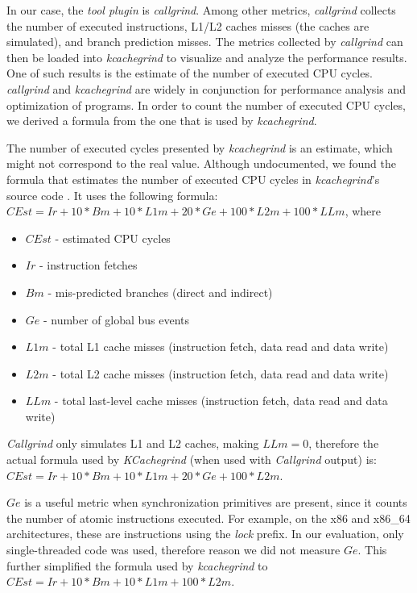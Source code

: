 \documentclass{llncs}
\begin{document}
In our case, the \textit{tool plugin} is \textit{callgrind}. Among other metrics, \textit{callgrind}
collects the number of executed instructions, L1/L2 caches misses (the caches are simulated), and branch
prediction misses. The metrics collected by \textit{callgrind} can then be loaded into \textit{kcachegrind}
to visualize and analyze the performance results. One of such results is the estimate of the number of executed CPU cycles.
\textit{callgrind} and \textit{kcachegrind} are widely in conjunction for performance analysis and optimization
of programs. In order to count the number of executed CPU cycles, we derived a formula from
the one that is used by \textit{kcachegrind}.

The number of executed cycles
presented by \textit{kcachegrind} is an estimate, which might not correspond to the real value.
Although undocumented, we found the formula that estimates the number of executed CPU cycles in
\textit{kcachegrind}'s source code \cite{cachegrind_source:online}.
It uses the
following formula: $CEst = Ir + 10*Bm + 10*L1m + 20*Ge + 100*L2m + 100*LLm$, where

\begin{itemize}
  \item $CEst$ - estimated CPU cycles
  \item $Ir$ - instruction fetches
  \item $Bm$ -  mis-predicted branches (direct and indirect)
  \item $Ge$ - number of global bus events
  \item $L1m$ - total L1 cache misses (instruction fetch, data read and data write)
  \item $L2m$ - total L2 cache misses (instruction fetch, data read and data write)
  \item $LLm$ - total last-level cache misses (instruction fetch, data read and data write)
\end{itemize}

\textit{Callgrind} only simulates L1 and L2 caches, making $LLm=0$, therefore the actual formula
used by \textit{KCachegrind} (when used with \textit{Callgrind} output) is:
$CEst = Ir + 10*Bm + 10*L1m + 20*Ge + 100*L2m$.

$Ge$ is a useful metric when synchronization primitives are present, since it counts the number of
atomic instructions executed. For example, on the x86 and x86\_64 architectures, these are
instructions using the \textit{lock} prefix. In our evaluation, only single-threaded code was used, therefore
reason we did not measure $Ge$. This further simplified the formula used by \textit{kcachegrind} to
$CEst = Ir + 10*Bm + 10*L1m + 100*L2m$.
\end{document}
